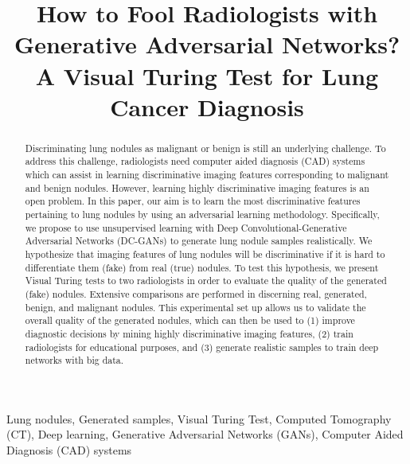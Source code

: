 \documentclass{article}
\title{How to Fool Radiologists with Generative Adversarial Networks?\\ A Visual Turing Test for Lung Cancer Diagnosis}
\begin{document}
%
\BgThispage

\maketitle
%


\begin{abstract}
Discriminating lung nodules as malignant or benign is still an underlying challenge. To address this challenge, radiologists need computer aided diagnosis (CAD) systems which can assist in learning discriminative imaging features corresponding to malignant and benign nodules. However, learning highly discriminative imaging features is an open problem. In this paper, our aim is to learn the most discriminative features pertaining to lung nodules by using an adversarial learning methodology. Specifically, we propose to use unsupervised learning with Deep Convolutional-Generative Adversarial Networks (DC-GANs) to generate lung nodule samples realistically. We hypothesize that imaging features of lung nodules will be discriminative if it is hard to differentiate them (fake) from real (true) nodules. To test this hypothesis, we present Visual Turing tests to two radiologists in order to evaluate the quality of the generated (fake) nodules. Extensive comparisons are performed in discerning real, generated, benign, and malignant nodules. This experimental set up allows us to validate the overall quality of the generated nodules, which can then be used to (1) improve diagnostic decisions by mining highly discriminative imaging features, (2) train radiologists for educational purposes, and (3) generate realistic samples to train deep networks with big data. 



\end{abstract}
%

\begin{keywords}
Lung nodules, Generated samples, Visual Turing Test, Computed Tomography (CT), Deep learning, Generative Adversarial Networks (GANs), Computer Aided Diagnosis (CAD) systems 
\end{keywords}
%

\vspace{-10 px}
\end{document}
